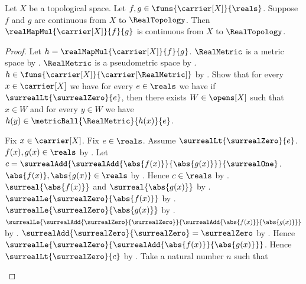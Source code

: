 \begin{theorem}\label{real_map_mul_continuous}
    Let $X$ be a topological space.
    Let $f,g\in\funs{\carrier[X]}{\reals}$.
    Suppose $f$ and $g$ are continuous from $X$ to $\RealTopology$.
    Then $\realMapMul{\carrier[X]}{f}{g}$ is continuous from $X$ to
        $\RealTopology$.
\end{theorem}
\begin{proof}
    Let $h=\realMapMul{\carrier[X]}{f}{g}$.
    $\RealMetric$ is a metric space by .
    $\RealMetric$ is a pseudometric space by
        .
    $h\in\funs{\carrier[X]}{\carrier[\RealMetric]}$
        by
        .
    Show that for every $x\in\carrier[X]$ we have
        for every $e\in\reals$ we have if
            $\surrealLt{\surrealZero}{e}$, then there exists
            $W\in\opens[X]$ such that $x\in W$ and
            for every $y\in W$ we have
                $h(y)\in\metricBall{\RealMetric}{h(x)}{e}$.
    \begin{subproof}
        Fix $x\in\carrier[X]$.
        Fix $e\in\reals$.
        Assume $\surrealLt{\surrealZero}{e}$.
        $f(x),g(x)\in\reals$ by .
        Let $c=\surrealAdd{\surrealAdd{\abs{f(x)}}{\abs{g(x)}}}
            {\surrealOne}$.
        $\abs{f(x)},\abs{g(x)}\in\reals$
            by .
        Hence $c\in\reals$
            by
            .
        $\surreal{\abs{f(x)}}$ and $\surreal{\abs{g(x)}}$
            by .
        $\surrealLe{\surrealZero}{\abs{f(x)}}$
            by
            .
        $\surrealLe{\surrealZero}{\abs{g(x)}}$
            by
            .
        $\surrealLe{\surrealAdd{\surrealZero}{\surrealZero}}
            {\surrealAdd{\abs{f(x)}}{\abs{g(x)}}}$
            by
            .
        $\surrealAdd{\surrealZero}{\surrealZero}=\surrealZero$
            by .
        Hence
            $\surrealLe{\surrealZero}
                {\surrealAdd{\abs{f(x)}}{\abs{g(x)}}}$.
        Hence $\surrealLt{\surrealZero}{c}$
            by
            .
        Take a natural number $n$ such that

\end{subproof}
\end{proof}
